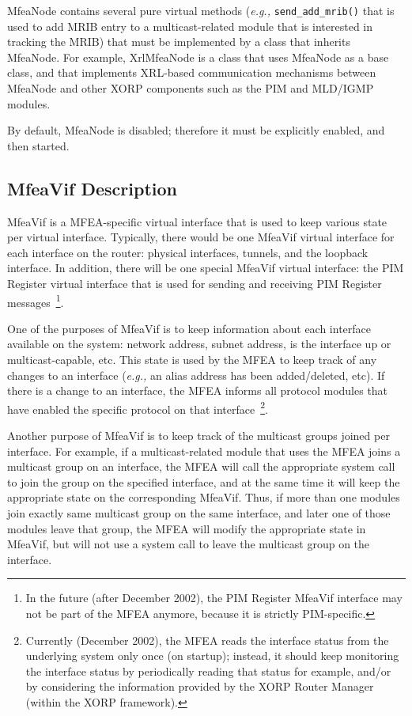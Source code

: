\documentclass[11pt]{article}
\newcommand{\eg}{\emph{e.g.,}\xspace}
\begin{document}
MfeaNode contains several pure virtual methods (\eg
\verb=send_add_mrib()= that is used to add MRIB entry to a
multicast-related module that is interested in tracking the MRIB) 
that must be implemented by a class that inherits MfeaNode.
For example, XrlMfeaNode is a class that uses MfeaNode as a base class,
and that implements XRL-based communication mechanisms between MfeaNode
and other XORP components such as the PIM and MLD/IGMP modules.

By default, MfeaNode is disabled; therefore it must be explicitly
enabled, and then started.

\subsection{MfeaVif Description}

MfeaVif is a MFEA-specific virtual interface that is used to keep
various state per virtual interface. Typically, there would be one
MfeaVif virtual interface for each interface on the router: physical
interfaces, tunnels, and the loopback interface. In addition, there will
be one special MfeaVif virtual interface: the PIM Register virtual
interface that is used for sending and receiving PIM Register
messages~\footnote{In the future (after December 2002), the PIM
Register MfeaVif interface may not be part of the MFEA anymore, because
it is strictly PIM-specific.}.

One of the purposes of MfeaVif is to keep information about each
interface available on the system: network address, subnet address, is
the interface up or multicast-capable, etc. This state is used by the
MFEA to keep track of any changes to an interface (\eg an alias address
has been added/deleted, etc). If there is a change to an interface, the
MFEA informs all protocol modules that have enabled the specific
protocol on that interface~\footnote{Currently (December 2002), the MFEA
reads the interface status from the underlying system 
only once (on startup); instead, it should keep monitoring the interface
status by periodically reading that status for example, and/or by
considering the information provided by the XORP Router Manager (within
the XORP framework).}.

Another purpose of MfeaVif is to keep track of the multicast groups
joined per interface. For example, if a multicast-related module that
uses the MFEA joins a multicast group on an interface, the MFEA will
call the appropriate system call to join the group on the specified
interface, and at the same time it will keep the appropriate state on
the corresponding MfeaVif. Thus, if more than one modules join exactly
same multicast group on the same interface, and later one of those
modules leave that group, the MFEA will modify the appropriate state in
MfeaVif, but will not use a system call to leave the multicast group on
the interface.
\end{document}
